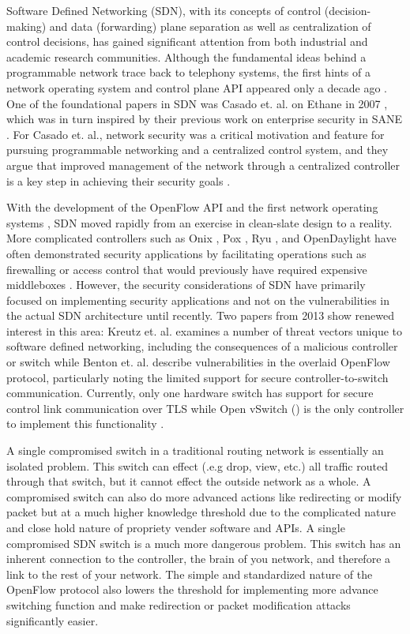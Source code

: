 Software Defined Networking (SDN), with its concepts of control (decision-making) and data (forwarding) plane separation as well as centralization of control decisions, has gained significant attention from both industrial and academic research communities.  Although the fundamental ideas behind a programmable network trace back to telephony systems, the first hints of a network operating system and control plane API appeared only a decade ago \cite{history}.  One of the foundational papers in SDN was Casado et. al. on Ethane in 2007 \cite{ethane}, which was in turn inspired by their previous work on enterprise security in SANE \cite{sane}.  For Casado et. al., network security was a critical motivation and feature for pursuing programmable networking and a centralized control system, and they argue that improved management of the network through a centralized controller is a key step in achieving their security goals \cite{ethane}.

With the development of the OpenFlow API and the first network operating systems \cite{openflow}\cite{nox}, SDN moved rapidly from an exercise in clean-slate design to a reality.  More complicated controllers such as Onix \cite{onix}, Pox \cite{pox}, Ryu \cite{ryu}, and OpenDaylight\cite{opendaylight} have often demonstrated security applications by facilitating operations such as firewalling or access control that would previously have required expensive middleboxes \cite{resonance}.  However, the security considerations of SDN have primarily focused on implementing security applications and not on the vulnerabilities in the actual SDN architecture until recently. Two papers from 2013 show renewed interest in this area: Kreutz et. al. examines a number of threat vectors unique to software defined networking, including the consequences of a malicious controller or switch \cite{sdnsec} while Benton et. al. describe vulnerabilities in the overlaid OpenFlow protocol, particularly noting the limited support for secure controller-to-switch communication. Currently, only one hardware switch has support for secure control link communication over TLS while Open vSwitch (\cite{openvswitch}) is the only controller to implement this functionality \cite{benton}. 

A single compromised switch in a traditional routing network is essentially an isolated problem. This switch can effect (.e.g drop, view, etc.) all traffic routed through that switch, but it cannot effect the outside network as a whole. A compromised switch can also do more advanced actions like redirecting or modify packet but at a much higher knowledge threshold due to the complicated nature and close hold nature of propriety vender software and APIs. A single compromised SDN switch is a much more dangerous problem. This switch has an inherent connection to the controller, the brain of you network, and therefore a link to the rest of your network. The simple and standardized nature of the OpenFlow protocol also lowers the threshold for implementing more advance switching function and make redirection or packet modification attacks significantly easier. 

